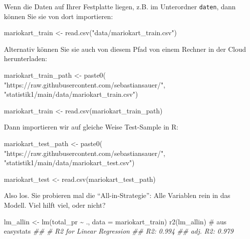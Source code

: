 \documentclass[
  letterpaper,
  twoside,
  open=any]{scrbook}
\newenvironment{Shaded}{\begin{snugshade}}{\end{snugshade}}
\newcommand{\AttributeTok}[1]{\textcolor[rgb]{0.40,0.45,0.13}{#1}}
\newcommand{\CommentTok}[1]{\textcolor[rgb]{0.37,0.37,0.37}{#1}}
\newcommand{\DocumentationTok}[1]{\textcolor[rgb]{0.37,0.37,0.37}{\textit{#1}}}
\newcommand{\FunctionTok}[1]{\textcolor[rgb]{0.28,0.35,0.67}{#1}}
\newcommand{\NormalTok}[1]{\textcolor[rgb]{0.00,0.23,0.31}{#1}}
\newcommand{\OtherTok}[1]{\textcolor[rgb]{0.00,0.23,0.31}{#1}}
\newcommand{\SpecialCharTok}[1]{\textcolor[rgb]{0.37,0.37,0.37}{#1}}
\newcommand{\StringTok}[1]{\textcolor[rgb]{0.13,0.47,0.30}{#1}}
\theoremstyle{definition}
\theoremstyle{definition}
\theoremstyle{definition}
\theoremstyle{remark}
\begin{document}
Wenn die Daten auf Ihrer Festplatte liegen, z.B. im Unterordner
\texttt{daten}, dann können Sie sie von dort importieren:

\begin{Shaded}
\begin{Highlighting}[]
\NormalTok{mariokart\_train }\OtherTok{\textless{}{-}} \FunctionTok{read.csv}\NormalTok{(}\StringTok{"data/mariokart\_train.csv"}\NormalTok{)}
\end{Highlighting}
\end{Shaded}

Alternativ können Sie sie auch von diesem Pfad von einem Rechner in der
Cloud herunterladen:

\begin{Shaded}
\begin{Highlighting}[]
\NormalTok{mariokart\_train\_path }\OtherTok{\textless{}{-}} \FunctionTok{paste0}\NormalTok{( }\StringTok{"https://raw.githubusercontent.com/sebastiansauer/"}\NormalTok{,}
\StringTok{"statistik1/main/data/mariokart\_train.csv"}\NormalTok{)}

\NormalTok{mariokart\_train }\OtherTok{\textless{}{-}} \FunctionTok{read.csv}\NormalTok{(mariokart\_train\_path)}
\end{Highlighting}
\end{Shaded}

Dann importieren wir auf gleiche Weise Test-Sample in R:

\begin{Shaded}
\begin{Highlighting}[]
\NormalTok{mariokart\_test\_path }\OtherTok{\textless{}{-}} \FunctionTok{paste0}\NormalTok{(}
 \StringTok{"https://raw.githubusercontent.com/sebastiansauer/"}\NormalTok{,}
 \StringTok{"statistik1/main/data/mariokart\_test.csv"}\NormalTok{)}

\NormalTok{mariokart\_test }\OtherTok{\textless{}{-}} \FunctionTok{read.csv}\NormalTok{(mariokart\_test\_path)}
\end{Highlighting}
\end{Shaded}

Also los. Sie probieren mal die \enquote{All-in-Strategie}: Alle
Variablen rein in das Modell. Viel hilft viel, oder nicht?

\begin{Shaded}
\begin{Highlighting}[]
\NormalTok{lm\_allin }\OtherTok{\textless{}{-}} \FunctionTok{lm}\NormalTok{(total\_pr }\SpecialCharTok{\textasciitilde{}}\NormalTok{ ., }\AttributeTok{data =}\NormalTok{ mariokart\_train)}
\FunctionTok{r2}\NormalTok{(lm\_allin)  }\CommentTok{\# aus easystats}
\DocumentationTok{\#\# \# R2 for Linear Regression}
\DocumentationTok{\#\#        R2: 0.994}
\DocumentationTok{\#\#   adj. R2: 0.979}
\end{Highlighting}
\end{Shaded}
\end{document}
